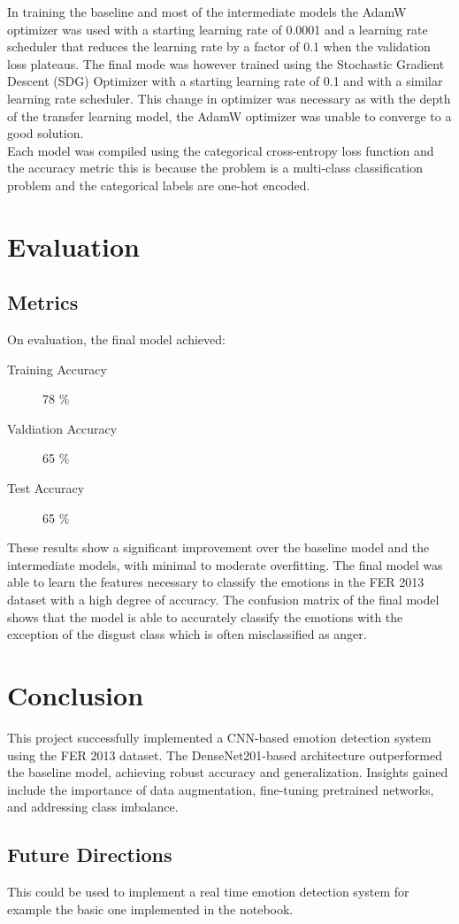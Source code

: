 \documentclass[12pt letter]{report}
\begin{document}
In training the baseline and most of the intermediate models the AdamW optimizer was used with a starting learning rate
of 0.0001 and a learning rate scheduler that reduces the learning rate by a factor of 0.1 when the validation loss
plateaus. The final mode was however trained using the Stochastic Gradient Descent (SDG) Optimizer with a starting learning
rate of 0.1 and with a similar learning rate scheduler. This change in optimizer was necessary as with the depth of the
transfer learning model, the AdamW optimizer was unable to converge to a good solution. \\

Each model was compiled using the categorical cross-entropy loss function and the accuracy metric this is because
the problem is a multi-class classification problem and the categorical labels are one-hot encoded. \\

\section*{Evaluation}

\subsection*{Metrics}

On evaluation, the final model achieved:
\begin{description}
  \item[Training Accuracy]  78 \%
  \item[Valdiation Accuracy]  65 \%
  \item [Test Accuracy]  65 \%
\end{description}

These results show a significant improvement over the baseline model and the intermediate models, with minimal to
moderate overfitting. The final model was able to learn the features necessary to classify the emotions in the FER 2013
dataset with a high degree of accuracy. The confusion matrix of the final model shows that the model is able to
accurately classify the emotions with the exception of the disgust class which is often misclassified as anger.

\section*{Conclusion}

This project successfully implemented a CNN-based emotion detection system using the FER 2013 dataset. The DenseNet201-based architecture outperformed the baseline model, achieving robust accuracy and generalization. Insights gained include the importance of data augmentation, fine-tuning pretrained networks, and addressing class imbalance.

\subsection*{Future Directions}

This could be used to implement a real time emotion detection system for example the basic one implemented in the
notebook.
\end{document}
